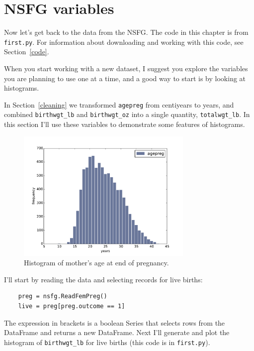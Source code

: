 \documentclass[12pt]{book}
\begin{document}
\section{NSFG variables}

Now let's get back to the data from the NSFG.  The code in this
chapter is from {\tt first.py}.  
For information about downloading and
working with this code, see Section~\ref{code}.


When you start working with a new dataset, I suggest you explore
the variables you are planning to use one at a time, and a good
way to start is by looking at histograms.

In Section~\ref{cleaning} we transformed {\tt agepreg}
from centiyears to years, and combined \verb"birthwgt_lb" and
\verb"birthwgt_oz" into a single quantity, \verb"totalwgt_lb".
In this section I'll use these variables to demonstrate some
features of histograms.

\begin{figure}
\centerline{\includegraphics[height=2.5in]{figs/first_agepreg_hist.pdf}}
\caption{Histogram of mother's age at end of pregnancy.}
\label{first_agepreg_hist}
\end{figure}

I'll start by reading the data and selecting records for live
births:

\begin{verbatim}
    preg = nsfg.ReadFemPreg()
    live = preg[preg.outcome == 1]
\end{verbatim}

The expression in brackets is a boolean Series that
selects rows from the DataFrame and returns a new DataFrame.
Next I'll generate and plot the histogram of
\verb"birthwgt_lb" for live births (this code is in {\tt first.py}).
\end{document}
